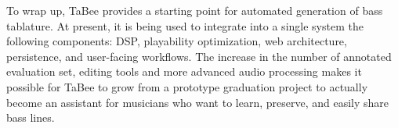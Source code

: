 \documentclass[a4paper, 12pt, titlepage]{article}
\begin{document}
To wrap up, TaBee provides a starting point for automated generation of bass tablature. At present, it is being used to integrate into a single system the following components: DSP, playability optimization, web architecture, persistence, and user-facing workflows. The increase in the number of annotated evaluation set, editing tools and more advanced audio processing makes it possible for TaBee to grow from a prototype graduation project to actually become an assistant for musicians who want to learn, preserve, and easily share bass lines.


\newpage
\nocite{*}


\end{document}
